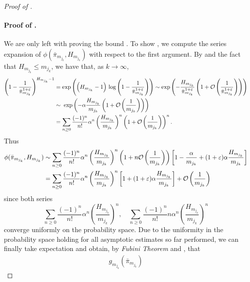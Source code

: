 \documentclass[11pt, a4paper, twoside]{article}
\DeclareRobustCommand{\bigO}{\text{\usefont{OMS}{cmsy}{m}{n}O}}
\newcommand{\eps}{\varepsilon}
\numberwithin{equation}{section}
\begin{document}
\begin{proof}[Proof of ]
            \paragraph{Proof of .} We are only left with proving the bound . To show , we compute the series expansion of $\phi(\bar{\pi}_{m_{j_k}},H_{m_{j_k}})$ with respect to the first argument. 
            By  and the fact that $H_{m_{j_k}}\le m_{j_k}$, we have that, as $k\longrightarrow\infty$,
    		\begin{align*}
    			\left(1-\frac{1}{\bar{\pi}_{m_{j_k}}^{1+\eps}}\right)^{H_{m_{j_k}}-1}  &=  \exp \left( \left( H_{m_{j_k}} - 1 \right) \, \log \left( 1 - \frac{1}{\bar{\pi}_{m_{j_k}}^{1+\eps}}\right) \right)
                     \sim \exp \left( -\frac{H_{m_{j_k}}}{\bar{\pi}_{m_{j_k}}^{1+\eps}}\left(1+\bigO\left(\frac{1}{\bar{\pi}_{m_{j_k}}^{1+\eps}} \right) \right) \right) \\
                    & \sim \; \exp \left( - \alpha \frac{H_{m_{j_k}}}{m_{j_k}} \left( 1 + \bigO\left(\frac{1}{m_{j_k}} \right)\right) \right)
                    \\& = \sum_{n\ge0}\frac{(-1)^n}{n!}\alpha^n\left(\frac{H_{m_{j_k}}}{m_{j_k}}\right)^n\left(1+\bigO\left(\frac{1}{m_{j_k}}\right)\right)^n.
    		\end{align*}
    		Thus
    		\begin{align*}
    			\phi(\bar{\pi}_{m_{j_k}},H_{m_{j_k}})&\sim \sum_{n\ge0}\frac{(-1)^n}{n!}\alpha^n\left(\frac{H_{m_{j_k}}}{m_{j_k}}\right)^n\left(1+n\bigO\left(\frac{1}{m_{j_k}}\right)\right)\left[1-\frac{\alpha}{m_{j_k}}+(1+\eps)\alpha\frac{H_{m_{j_k}}}{m_{j_k}}\right]\\&= \sum_{n\ge0}\frac{(-1)^n}{n!}\alpha^n\left(\frac{H_{m_{j_k}}}{m_{j_k}}\right)^n\left[1+(1+\eps)\alpha\frac{H_{m_{j_k}}}{m_{j_k}}\right]+\bigO\left(\frac{1}{m_{j_k}}\right)
    		\end{align*}
    		since both series 
            \[
                \sum_{n\ge0}\frac{(-1)^n}{n!}\alpha^n\left(\frac{H_{m_{j_k}}}{m_{j_k}}\right)^n
                ,\quad
                \sum_{n\ge0}\frac{(-1)^n}{n!}n\alpha^n\left(\frac{H_{m_{j_k}}}{m_{j_k}}\right)^n
            \]
    		converge uniformly on the probability space. 
            Due to the uniformity in the probability space holding for all asymptotic estimates so far performed, we can finally take expectation and obtain, by \textit{Fubini Theorem} and , that
    		\begin{align*}
                g_{m_{j_k}}(\bar{\pi}_{m_{j_k}})

\end{align*}
\end{proof}
\end{document}
